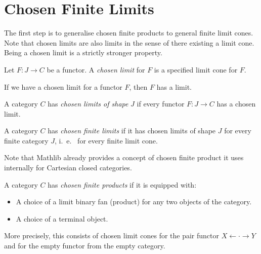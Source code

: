 \section{Chosen Finite Limits}

The first step is to generalise chosen finite products to general finite limit cones. Note that chosen limits are also limits in the sense of there existing a limit cone. Being a chosen limit is a strictly stronger property.

\begin{definition}
  \label{def:chosen-limit}
  \leanok
Let $F : J \to C$ be a functor. A \emph{chosen limit} for $F$ is a specified limit cone for $F$.
\end{definition}

\begin{proposition}
\label{prop:chosen-limit-implies-limit}
\leanok
{}
If we have a chosen limit for a functor $F$, then $F$ has a limit.
\end{proposition}

\begin{definition}
  \label{def:chosen-limits-of-shape}
  \leanok
A category $C$ has \emph{chosen limits of shape} $J$ if every functor $F : J \to C$ has a chosen limit.
\end{definition} 

\begin{definition}
\label{def:chosen-finite-limits}
\leanok
A category $C$ has \emph{chosen finite limits} if it has chosen limits of shape $J$ for every finite category $J$, i.~e.~ for every finite limit cone.
\end{definition}

Note that Mathlib already provides a concept of chosen finite product it uses internally for Cartesian closed categories.

\begin{definition}
\label{def:chosen-finite-products}
\mathlibok
A category $C$ has \emph{chosen finite products} if it is equipped with:
\begin{itemize}
\item A choice of a limit binary fan (product) for any two objects of the category.
\item A choice of a terminal object.
\end{itemize}
More precisely, this consists of chosen limit cones for the pair functor $X \leftarrow \cdot \rightarrow Y$ and for the empty functor from the empty category.
\end{definition}

